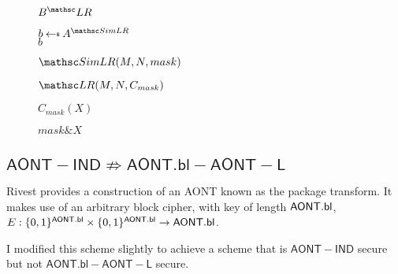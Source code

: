 \documentclass[11pt,twoside]{article}
\begin{document}
\begin{figure}[H]
{
\underline{$\advB^\LRO$}

\begin{algorithm}[H]
$b\getsr \advA^{\procfont{SimLR}}$\\
\Return $b$
\end{algorithm}

\underline{$\procfont{SimLR}(M,N,mask)$}

\begin{algorithm}[H]
\Return $\LRO(M,N,C_{mask})$
\end{algorithm}

\underline{$C_{mask}(X)$}

\begin{algorithm}[H]
\Return $mask \mathrel{\&} X$
\end{algorithm}
}
\end{figure}

\subsection{$\mathsf{AONT-IND} \not\Rightarrow \mathsf{AONT.bl-AONT-L}$}

Rivest provides a construction of an AONT known as the package transform. It makes use of an arbitrary block cipher, with key of length $\mathsf{AONT.bl}$, $E : \{0,1\}^{\mathsf{AONT.bl}} \times \{0,1\}^{\mathsf{AONT.bl}}\rightarrow \mathsf{AONT.bl}$. 

I modified this scheme slightly to achieve a scheme that is $\mathsf{AONT-IND}$ secure but not $\mathsf{AONT.bl-AONT-L}$ secure. 
\end{document}
